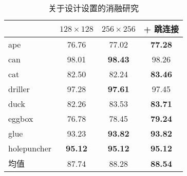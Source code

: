 \begin{table}[htbp]
  \centering
  \caption{关于设计设置的消融研究}
  \begin{tabular}{lccc}
  \toprule 
  & $128\times128$ & $256\times256$ & + 跳连接 \\
  \midrule
  ape & 76.76 & 77.02 & \textbf{77.28} \\
  can & 98.01 & \textbf{98.43} & 98.26 \\
  cat & 82.50 & 82.24 & \textbf{83.46} \\
  driller & 97.28 & \textbf{97.61} & 97.45 \\
  duck & 82.26 & 83.53 & \textbf{83.71} \\
  eggbox & 76.78 & 78.45 & \textbf{79.24} \\
  glue & 93.23 & \textbf{93.82} & \textbf{93.82} \\
  holepuncher & \textbf{95.12} & \textbf{95.12} & \textbf{95.12} \\
  \midrule
  均值 & 87.74 & 88.28 & \textbf{88.54} \\
  \bottomrule
  \end{tabular}
  \label{tab:main_ablation}
\end{table}